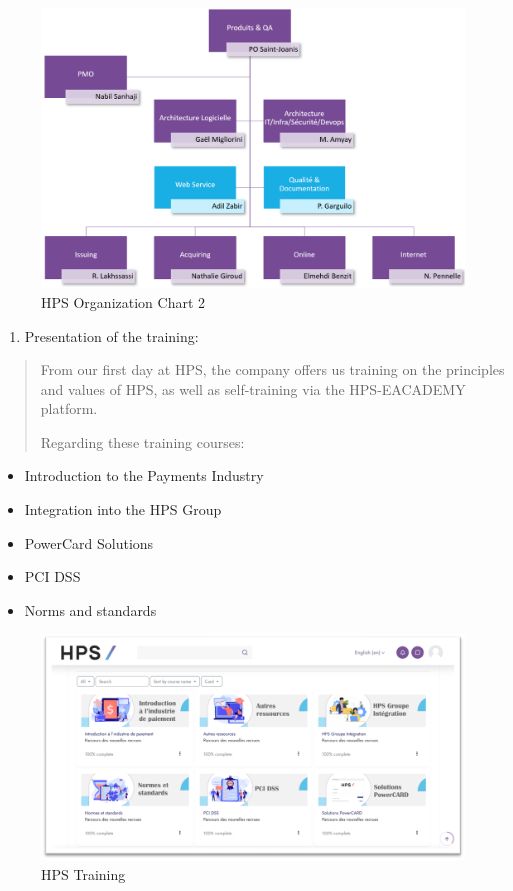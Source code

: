 \documentclass[12pt,a4paper]{report}
\begin{document}
\begin{figure}[H]
\centering
\includegraphics[width=6.4in]{vertopal_d1b0b2209edd4c6aa8254f57daa0953b/media/image25.png}
\caption{HPS Organization Chart 2}
\label{fig:hpsOrgChart2}
\end{figure}


\begin{enumerate}
\def\labelenumi{\arabic{enumi}.}
\setcounter{enumi}{7}
\item
  \protect\hypertarget{_Toc201954402}{}{}Presentation of the training:
\end{enumerate}

\begin{quote}
From our first day at HPS, the company offers us training on the
principles and values \hspace{0pt}\hspace{0pt}of HPS, as well as
self-training via the HPS-EACADEMY platform.

Regarding these training courses:
\end{quote}

\begin{itemize}
\item
  Introduction to the Payments Industry
\item
  Integration into the HPS Group
\item
  PowerCard Solutions
\item
  PCI DSS
\item
  Norms and standards
\end{itemize}

\begin{figure}[H]
\centering
\includegraphics[width=4.8in]{vertopal_d1b0b2209edd4c6aa8254f57daa0953b/media/image26.png}
\caption{HPS Training}
\label{fig:hpsTraining}
\end{figure}
\end{document}
